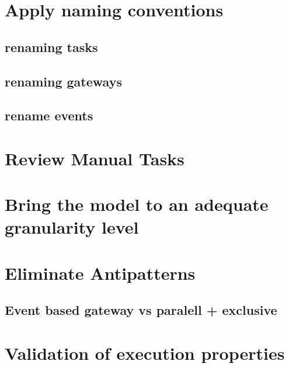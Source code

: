 \section{Apply naming conventions}
\subsection{renaming tasks}
\subsection{renaming gateways}
\subsection{rename events}

\section{Review Manual Tasks}
\section{Bring the model to an adequate granularity level}
\section{Eliminate Antipatterns}
\subsection{Event based gateway vs paralell + exclusive}

\section{Validation of execution properties}

